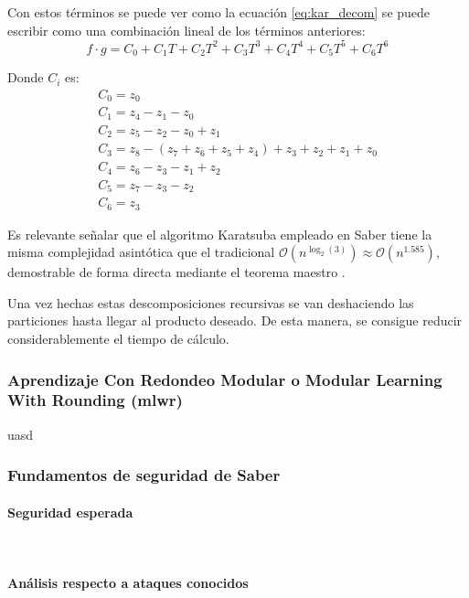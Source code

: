 Con estos términos se puede ver como la ecuación \ref{eq:kar_decom} se puede escribir como una combinación lineal de los términos anteriores:
\begin{equation}
	f\cdot g= C_0+C_1 T+C_2 T^{2}+C_3 T^{3}+C_4 T^{4}+C_5 T^{5}+C_6 T^{6}
\end{equation}

Donde \(C_i\) es:
\begin{equation}
	\begin{array}{l}
		C_0=z_0\\
		C_1= z_4 - z_1 - z_0\\
		C_2=z_5 -z_2-z_0+z_1\\
		C_3=z_8 - \left(z_7+z_6+z_5+z_4\right)+z_3+z_2+z_1+z_0\\
		C_4=z_6 -z_3-z_1+z_2\\
		C_5= z_7 -z_3-z_2\\
		C_6=z_3
	\end{array}
\end{equation}

Es relevante señalar que el algoritmo Karatsuba empleado en Saber tiene la misma complejidad asintótica que el tradicional \(\mathcal{O}(n^{\log_2(3)})\approx\mathcal{O}(n^{1.585})\), demostrable de forma directa mediante el teorema maestro \cite{masterTh}. 
\newline

Una vez hechas estas descomposiciones recursivas se van deshaciendo las particiones hasta llegar al producto deseado. De esta manera, se consigue reducir considerablemente el tiempo de cálculo.
 
 \newpage
 
\subsubsection{Aprendizaje Con Redondeo Modular o Modular Learning With Rounding (\gls{mlwr})} 
uasd \cite{modlwr}
\subsubsection{Fundamentos de seguridad de Saber}
\paragraph{Seguridad esperada}
\mbox{}\\
\paragraph{Análisis respecto a ataques conocidos}
\mbox{}\\
